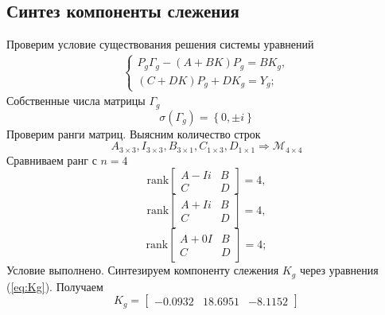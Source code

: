 \documentclass[a4paper, 12pt]{article}
\begin{document}
    \subsection{Синтез компоненты слежения}
    Проверим условие существования решения
    системы уравнений
    \begin{align}
    \begin{cases}
    P_g\Gamma_g-\left( A+BK \right)P_g=BK_g,\\
    \left( C+DK \right)P_g+DK_g=Y_g;
    \end{cases} \label{eq:Kg}
    \end{align}
    Собственные числа матрицы $\Gamma_g$
    $$
    \sigma\left( \Gamma_g \right)=\left\{ 0,\pm i \right\}
    $$
    Проверим ранги матриц. Выясним количество строк
    $$A_{3\times3},I_{3\times3},B_{3\times1},C_{1\times3},D_{1\times1}\Rightarrow \mathcal{M}_{4\times4}$$
    Сравниваем ранг с $n=4$
    $$
    \text{rank}\begin{bmatrix}
        A-Ii &B\\
        C &D
    \end{bmatrix}=4,
    $$
    $$
    \text{rank}\begin{bmatrix}
        A+Ii &B\\
        C &D
    \end{bmatrix}=4,
    $$
    $$
    \text{rank}\begin{bmatrix}
        A+0I &B\\
        C &D
    \end{bmatrix}=4;
    $$
    Условие выполнено. Синтезируем компоненту слежения $K_g$ через уравнения (\ref{eq:Kg}).
    Получаем
    $$
    K_g=
    \begin{bmatrix}
        -0.0932   &18.6951   &-8.1152
    \end{bmatrix}
    $$
\end{document}
